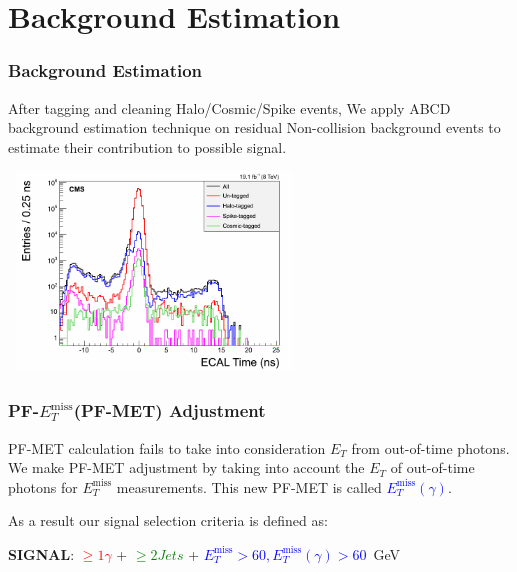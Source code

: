 \documentclass{beamer}
\begin{document}
\section{Background Estimation}
\begin{frame}
\frametitle{\Huge{Background Estimation}}
\small{
After tagging and cleaning Halo/Cosmic/Spike events, We apply \alert{ABCD} background estimation technique on residual Non-collision background events to estimate their contribution to possible signal.}
\begin{tcolorbox}[colback=UNL@Cream!5,colframe=UMN@Maroon!40,title=\textcolor{black}{\textbf{Event Tagging and Cleaning Performance}}]

\mbox{
 \includegraphics[height=5.30cm,width=0.7\paperwidth]{THESISPLOTS/TimeForAll.png}
 } 
 \end{tcolorbox}
\end{frame}

\begin{frame}
\frametitle{PF-$E^{\mbox{miss}}_{T}$(PF-MET) Adjustment}

\begin{tcolorbox}[colback=UNL@Cream!5,colframe=UMN@Maroon!40,title=\textcolor{black}{$E^{\mbox{miss}}_{T}(\gamma)$}]
PF-MET calculation fails to take into consideration $E_{T}$ from out-of-time photons.
We make PF-MET adjustment by taking into account the $E_{T}$ of out-of-time photons for $E^{\mbox{miss}}_{T}$ measurements. This new  PF-MET is called \textcolor{blue}{$E^{\mbox{miss}}_{T}( \gamma)$}.
\end{tcolorbox}
As a result our signal selection criteria is defined as:

\begin{tcolorbox}[colback=UNL@Cream!5,colframe=UMN@Maroon!40,title=\textcolor{black}{\textcolor{green}{\textbf{Signal Selection Criteria}}}]
\textcolor{UMN@Maroon}{\textbf{SIGNAL}}: \textcolor{red}{$\geq 1 \gamma$}  + \textcolor{green}{$\geq 2 Jets$} + \textcolor{blue}{$E^{\mbox{miss}}_{T} > 60, E^{\mbox{miss}}_{T}(\gamma) > 60$}~GeV
\end{tcolorbox}
\end{frame}
\end{document}
